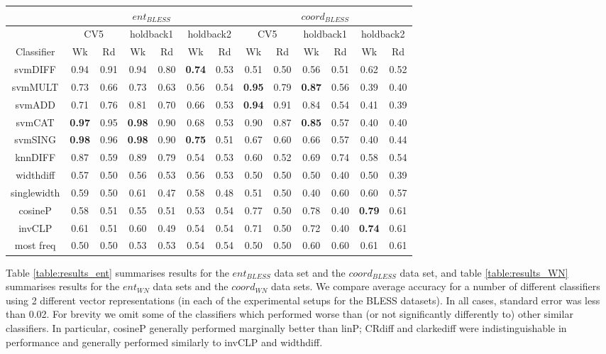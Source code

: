 \documentclass[11pt]{article}
\begin{document}
\begin{table*}[ht]
\centering
\begin{tabular}{|c|c|c|c|c|c|c||c|c|c|c|c|c|}
\hline
&\multicolumn{6}{|c||}{$ent_{BLESS}$}&\multicolumn{6}{|c|}{$coord_{BLESS}$}\\
\hline
&\multicolumn{2}{|c|}{CV5}&\multicolumn{2}{|c|}{holdback1}&\multicolumn{2}{|c||}{holdback2}&\multicolumn{2}{|c|}{CV5}&\multicolumn{2}{|c|}{holdback1}&\multicolumn{2}{|c|}{holdback2}\\
\hline
Classifier&Wk&Rd&Wk&Rd&Wk&Rd&Wk&Rd&Wk&Rd&Wk&Rd\\
\hline
svmDIFF&0.94&0.91&0.94&0.80&\textbf{0.74}&0.53&0.51&0.50&0.56&0.51&0.62&0.52\\
svmMULT&0.73&0.66&0.73&0.63&0.56&0.54&\textbf{0.95}&0.79&\textbf{0.87}&0.56&0.39&0.40\\
svmADD&0.71&0.76&0.81&0.70&0.66&0.53&\textbf{0.94}&0.91&0.84&0.54&0.41&0.39\\
svmCAT&\textbf{0.97}&0.95&\textbf{0.98}&0.90&0.68&0.53&0.90&0.87&\textbf{0.85}&0.57&0.40&0.40\\
svmSING&\textbf{0.98}&0.96&\textbf{0.98}&0.90&\textbf{0.75}&0.51&0.67&0.60&0.66&0.57&0.40&0.44\\
knnDIFF&0.87&0.59&0.89&0.79&0.54&0.53&0.60&0.52&0.69&0.74&0.58&0.54\\
\hline
widthdiff&0.57&0.50&0.56&0.53&0.56&0.53&0.50&0.50&0.50&0.40&0.50&0.39\\
singlewidth&0.59&0.50&0.61&0.47&0.58&0.48&0.51&0.50&0.40&0.60&0.60&0.57\\
cosineP&0.58&0.51&0.55&0.51&0.53&0.54&0.77&0.50&0.78&0.40&\textbf{0.79}&0.61\\
invCLP&0.61&0.51&0.60&0.49&0.54&0.54&0.71&0.50&0.72&0.40&\textbf{0.74}&0.61\\
most freq&0.50&0.50&0.53&0.53&0.54&0.54&0.50&0.50&0.60&0.60&0.61&0.61\\
\hline
\end{tabular}
\caption{Accuracy Figures for the \emph{$ent_{BLESS}$} and \emph{$coord_{BLESS}$} data sets using the 3 different experimental setups (Errors $< $0.02)}
\label{table:results_ent}
\end{table*}

Table \ref{table:results_ent} summarises results for the $ent_{BLESS}$ data set and the $coord_{BLESS}$ data set, and table \ref{table:results_WN} summarises results for the $ent_{WN}$ data sets and the $coord_{WN}$ data sets.  We compare average accuracy for a number of different classifiers using 2 different vector representations (in each of the experimental setups for the BLESS datasets).  In all cases, standard error was less than 0.02.  For brevity we omit some of the classifiers which performed worse than (or not significantly differently to) other similar classifiers.  In particular, cosineP generally performed marginally better than linP; CRdiff and clarkediff were indistinguishable in performance and generally performed similarly to invCLP and widthdiff.
\end{document}
